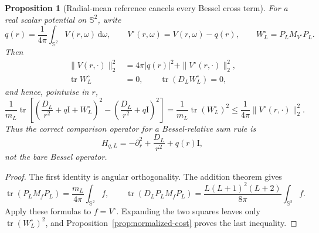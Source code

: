 \documentclass[11pt]{article}
\newcommand{\Id}{\mathrm I}
\newcommand{\dd}{\,\mathrm d}
\DeclareMathOperator{\tr}{tr}
\newtheorem{proposition}[theorem]{Proposition}
\theoremstyle{definition}
\theoremstyle{remark}
\begin{document}
\begin{proposition}[Radial-mean reference cancels every Bessel cross term]
\label{prop:radial-mean-Bessel-cancellation}
For a real scalar potential on $\mathbb S^2$, write
\begin{equation}
 q(r)=\frac1{4\pi}\int_{\mathbb S^2}V(r,\omega)\dd\omega,
 \qquad
 V^\circ(r,\omega)=V(r,\omega)-q(r),
 \qquad
 W_L^\circ=P_LM_{V^\circ}P_L.
 \label{eq:radial-mean-splitting}
\end{equation}
Then
\begin{align}
 \|V(r,\cdot)\|_2^2
 &=4\pi|q(r)|^2+\|V^\circ(r,\cdot)\|_2^2,
 \label{eq:radial-mean-cost-splitting}\\
 \tr W_L^\circ&=0,
 \qquad
 \tr(D_LW_L^\circ)=0,
 \label{eq:radial-mean-trace-cancellation}
\end{align}
and hence, pointwise in $r$,
\begin{equation}
 \frac1{m_L}\tr\!\left[
 \left(\frac{D_L}{r^2}+q\Id+W_L^\circ\right)^2
 -\left(\frac{D_L}{r^2}+q\Id\right)^2\right]
 =\frac1{m_L}\tr(W_L^\circ)^2
 \leq\frac1{4\pi}\|V^\circ(r,\cdot)\|_2^2.
 \label{eq:radial-mean-relative-quadratic-invariant}
\end{equation}
Thus the correct comparison operator for a Bessel-relative sum rule is
\begin{equation}
 H_{q,L}=-\partial_r^2+\frac{D_L}{r^2}+q(r)\Id,
 \label{eq:radial-mean-reference-operator}
\end{equation}
not the bare Bessel operator.
\end{proposition}

\begin{proof}
The first identity is angular orthogonality.  The addition theorem gives
\begin{equation}
 \tr(P_LM_fP_L)=\frac{m_L}{4\pi}\int_{\mathbb S^2}f,
 \qquad
 \tr(D_LP_LM_fP_L)
 =\frac{L(L+1)^2(L+2)}{8\pi}\int_{\mathbb S^2}f.
\end{equation}
Apply these formulas to $f=V^\circ$.  Expanding the two squares leaves only
$\tr(W_L^\circ)^2$, and Proposition~\ref{prop:normalized-cost} proves the
last inequality.
\end{proof}
\end{document}
